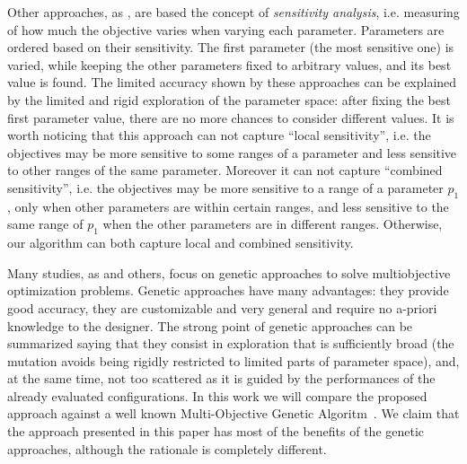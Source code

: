 Other approaches, as \cite{fornaciari_codes01,palesi_iwsoc02}, are based the concept of \emph{sensitivity analysis}, i.e. measuring of how much the objective varies when varying each parameter.
Parameters are ordered based on their sensitivity. The first parameter (the most sensitive one) is varied, while keeping the other parameters fixed to arbitrary values, and its best value is found. The limited accuracy shown by these approaches can be explained by the limited and rigid exploration of the parameter
space: after fixing the best first parameter value, there are no more chances to consider different values. It is worth noticing that this approach can not capture
``local sensitivity'', i.e. the objectives may be more sensitive to some
ranges of a parameter and less sensitive to other ranges of the same
parameter. Moreover it can not capture ``combined sensitivity'', i.e. the objectives may be
more sensitive to a range of a parameter $p_{1}$, only when other
parameters are within certain ranges, and less sensitive to the same
range of $p_{1}$ when the other parameters are in different ranges. Otherwise, our algorithm can both capture local and combined sensitivity.


Many studies, as \cite{coello_easmop} and others, focus on genetic approaches to solve multiobjective
optimization problems. Genetic approaches
have many advantages: they provide good accuracy, they are customizable and very general
and require no a-priori knowledge to the designer.  The strong
point of genetic approaches can be summarized saying that they consist
in exploration that is sufficiently broad (the mutation avoids being rigidly restricted to limited parts of parameter space), and, at the same time, not too scattered as it is guided by the performances of
the already evaluated configurations. In this work we will compare 
the proposed approach against a well known Multi-Objective Genetic
Algoritm~\cite{knowles_techrep06}.
We claim that the approach presented in this paper has most of the benefits of the genetic
approaches, although the rationale is completely different.
